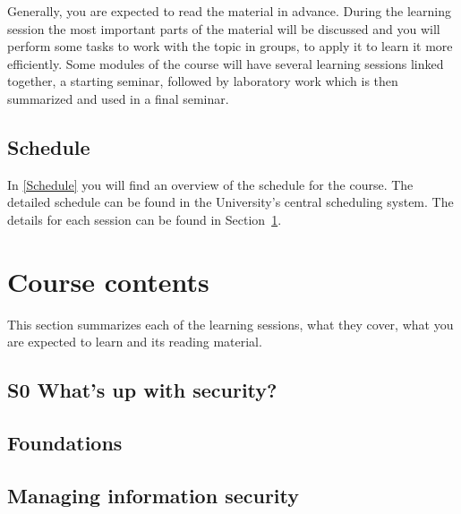 Generally, you are expected to read the material in advance.
During the learning session the most important parts of the material will be 
discussed and you will perform some tasks to work with the topic in groups, 
\ie to apply it to learn it more efficiently.
Some modules of the course will have several learning sessions linked together,
\eg a starting seminar, followed by laboratory work which is then summarized 
and used in a final seminar.

\subsection{Schedule}

In \cref{Schedule} you will find an overview of the schedule for the course.
The detailed schedule can be found in the University's central scheduling 
system.
The details for each session can be found in Section~\ref{CourseContents}.

\begin{frame}[allowframebreaks]

\end{frame}


\section{Course contents}%
\label{CourseContents}

This section summarizes each of the learning sessions, \ie what they cover, 
what you are expected to learn and its reading material.

%
%
\subsection{S0 What's up with security?}%
\label{security-society-seminar}


\subsection{Foundations}%
\label{foundations}


\subsection{Managing information security}%
\label{msb-framework}


